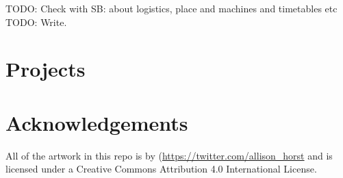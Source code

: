 \documentclass[
]{book}
\begin{document}
TODO: Check with SB: about logistics, place and machines and timetables etc
TODO: Write.

\hypertarget{projects}{%
\chapter{Projects}\label{projects}}

\hypertarget{acknowledgements}{%
\chapter{Acknowledgements}\label{acknowledgements}}

All of the artwork in this repo is by \citep[\textbackslash{}][]{allison_horst}(\url{https://twitter.com/allison_horst} and is licensed under a Creative Commons Attribution 4.0 International License.

  
\end{document}
